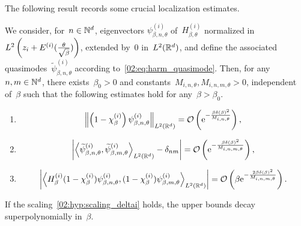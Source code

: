     The following result records some crucial localization estimates.
    \begin{lemma}
        \label{02:lemma:localization}
        We consider, for~$n\in\mathbb{N}^d$, eigenvectors $\psi_{\beta,n,\theta}^{(i)}$ of~$H^{(i)}_{\beta,\theta}$ normalized in~$L^2\left(z_i+E^{(i)}(\frac{\theta}{\sqrt\beta})\right)$, extended by~0 in~$L^2(\mathbb{R}^d)$, and define the associated quasimodes~$\widetilde\psi_{\beta,n,\theta}^{(i)}$ according to~\eqref{02:eq:harm_quasimode}.
        Then, for any~$n,m\in\mathbb{N}^d$, there exists~$\beta_0>0$ and constants~$M_{i,n,\theta},M_{i,n,m,\theta}>0$, independent of~$\beta$ such that the following estimates hold for any~$\beta>\beta_0$.
        \begin{enumerate}[]
            \item{\begin{equation}\label{02:eq:loc_eqa}\left\|\left(1-\chi_\beta^{(i)}\right)\psi_{\beta,n,\theta}^{(i)}\right\|_{L^2(\mathbb{R}^d)} = \mathcal{O}\left(\mathrm{e}^{-\frac{\beta\delta(\beta)^2}{M_{i,n,\theta}}}\right),\end{equation}}
            \item{\begin{equation}\label{02:eq:loc_eqb}\left|\left\langle \widetilde\psi_{\beta,n,\theta}^{(i)},\widetilde\psi_{\beta,m,\theta}^{(i)}\right\rangle_{L^2(\mathbb{R}^d)}-\delta_{nm}\right| =\mathcal{O}\left(\mathrm{e}^{-\frac{\beta\delta(\beta)^2}{M_{i,n,m,\theta}}}\right),\end{equation}} 
            \item{\begin{equation}\label{02:eq:loc_eqc}\left|\left\langle H_\beta^{(i)}(1-\chi_\beta^{(i)})\psi_{\beta,n,\theta}^{(i)},(1-\chi_\beta^{(i)})\psi_{\beta,m,\theta}^{(i)}\right\rangle_{L^2(\mathbb{R}^d)}\right| = \mathcal{O}\left(\beta\mathrm{e}^{-\frac{2\beta\delta(\beta)^2}{M_{i,n,m,\theta}}}\right).\end{equation}}
        \end{enumerate}
        If the scaling~\eqref{02:hyp:scaling_deltai} holds, the upper bounds decay superpolynomially in~$\beta$.
    \end{lemma}
